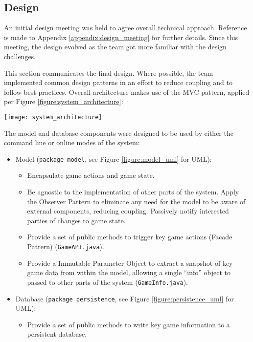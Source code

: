 \subsection{Design}

An initial design meeting was held to agree overall technical approach.
Reference is made to Appendix \ref{appendix:design_meeting} for further details.
Since this meeting, the design evolved as the team got more familiar with the design challenges.

This section communicates the final design.
Where possible, the team implemented common design patterns in an effort to reduce coupling and to follow best-practices.
Overall architecture makes use of the MVC pattern, applied per Figure \ref{figure:system_architecture}:

\begin{center}
	\texttt{[image: system\_architecture]}
	\label{figure:system_architecture}
\end{center}

The model and database components were designed to be used by either the command line or online modes of the system:

\begin{itemize}
	\item Model (\texttt{package model}, see Figure \ref{figure:model_uml} for UML):
	\begin{itemize}
		\item Encapsulate game actions and game state.
		\item Be agnostic to the implementation of other parts of the system. Apply the Observer Pattern to eliminate any need for the model to be aware of external components, reducing coupling. Passively notify interested parties of changes to game state.
		\item Provide a set of public methods to trigger key game actions (Facade Pattern) (\texttt{GameAPI.java}).
		\item Provide a Immutable Parameter Object to extract a snapshot of key game data from within the model, allowing a single ``info'' object to passed to other parts of the system (\texttt{GameInfo.java}).
	\end{itemize}

	\item Database (\texttt{package persistence}, see Figure \ref{figure:persistence_uml} for UML):
	\begin{itemize}
		\item Provide a set of public methods to write key game information to a persistent database.
	\end{itemize}
\end{itemize}

